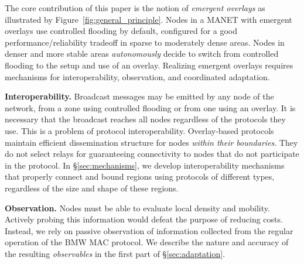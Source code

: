 
The core contribution of this paper is the notion of \emph{emergent overlays} as illustrated by Figure~\ref{fig:general_principle}. 
Nodes in a MANET with emergent overlays use controlled flooding by default, configured for a good performance/reliability tradeoff in sparse to moderately dense areas.
Nodes in denser and more stable areas \emph{autonomously} decide to switch from controlled flooding to the setup and use of an overlay.
Realizing emergent overlays requires mechanisms for interoperability, observation, and coordinated adaptation.

\smallskip
\noindent
\textbf{Interoperability.}
%
Broadcast messages may be emitted by any node of the network, from a zone using controlled flooding or from one using an overlay.
It is necessary that the broadcast reaches all nodes regardless of the protocols they use.
This is a problem of protocol interoperability.
Overlay-based protocols maintain efficient dissemination structure for nodes \emph{within their boundaries}.
They do not select relays for guaranteeing connectivity to nodes that do not participate in the protocol.
In \S\ref{sec:mechanisms}, we develop interoperability mechanisms that properly connect and bound regions using protocols of different types, regardless of the size and shape of these regions.

\smallskip
\noindent
\textbf{Observation.}
%
Nodes must be able to evaluate local density and mobility.
Actively probing this information would defeat the purpose of reducing costs.
Instead, we rely on passive observation of information collected from the regular operation of the BMW MAC protocol. 
We describe the nature and accuracy of the resulting \emph{observables} in the first part of \S\ref{sec:adaptation}.

